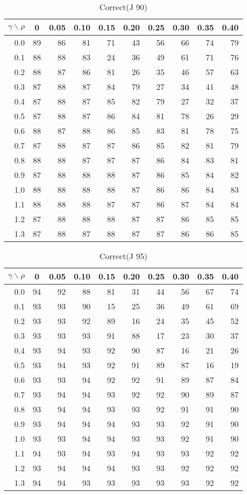 \documentclass[12pt]{article}
\begin{document}
%
\begin{table}[!tbp]
\caption{Correct(J 90)}
 \begin{center}
 \begin{tabular}{r|rrrrrrrrr}\hline\hline
\multicolumn{1}{c|}{$\gamma\backslash\rho$}&\multicolumn{1}{c}{0}&\multicolumn{1}{c}{0.05}&\multicolumn{1}{c}{0.10}&\multicolumn{1}{c}{0.15}&\multicolumn{1}{c}{0.20}&\multicolumn{1}{c}{0.25}&\multicolumn{1}{c}{0.30}&\multicolumn{1}{c}{0.35}&\multicolumn{1}{c}{0.40}\tabularnewline
\hline

0.0&89&86&81&71&43&56&66&74&79\tabularnewline
0.1&88&88&83&24&36&49&61&71&76\tabularnewline
0.2&88&87&86&81&26&35&46&57&63\tabularnewline
0.3&87&88&87&84&79&27&34&41&48\tabularnewline
0.4&87&88&87&85&82&79&27&32&37\tabularnewline
0.5&87&88&87&86&84&81&78&26&29\tabularnewline
0.6&88&87&88&86&85&83&81&78&75\tabularnewline
0.7&87&88&87&87&86&85&82&81&79\tabularnewline
0.8&88&88&87&87&87&86&84&83&81\tabularnewline
0.9&87&88&88&88&87&86&85&84&82\tabularnewline
1.0&88&88&88&88&87&86&86&84&83\tabularnewline
1.1&88&88&88&87&87&86&87&84&84\tabularnewline
1.2&87&88&88&88&87&87&86&85&85\tabularnewline
1.3&87&88&87&88&87&87&86&86&85\tabularnewline
\hline
\end{tabular}

\end{center}

\end{table}

%
\begin{table}[!tbp]
\caption{Correct(J 95)}
 \begin{center}
 \begin{tabular}{r|rrrrrrrrr}\hline\hline
\multicolumn{1}{c|}{$\gamma\backslash\rho$}&\multicolumn{1}{c}{0}&\multicolumn{1}{c}{0.05}&\multicolumn{1}{c}{0.10}&\multicolumn{1}{c}{0.15}&\multicolumn{1}{c}{0.20}&\multicolumn{1}{c}{0.25}&\multicolumn{1}{c}{0.30}&\multicolumn{1}{c}{0.35}&\multicolumn{1}{c}{0.40}\tabularnewline
\hline

0.0&94&92&88&81&31&44&56&67&74\tabularnewline
0.1&93&93&90&15&25&36&49&61&69\tabularnewline
0.2&93&93&92&89&16&24&35&45&52\tabularnewline
0.3&93&93&93&91&88&17&23&30&37\tabularnewline
0.4&93&94&93&92&90&87&16&21&26\tabularnewline
0.5&93&94&93&92&91&89&87&16&19\tabularnewline
0.6&93&93&94&92&92&91&89&87&84\tabularnewline
0.7&93&94&94&93&92&92&90&89&87\tabularnewline
0.8&93&94&94&93&93&92&91&91&90\tabularnewline
0.9&93&94&94&94&93&93&92&91&90\tabularnewline
1.0&93&93&94&94&93&93&92&91&90\tabularnewline
1.1&94&93&94&93&94&93&93&92&92\tabularnewline
1.2&93&94&94&94&93&93&92&92&92\tabularnewline
1.3&94&94&93&93&93&93&93&92&92\tabularnewline
\hline
\end{tabular}

\end{center}

\end{table}
\end{document}
